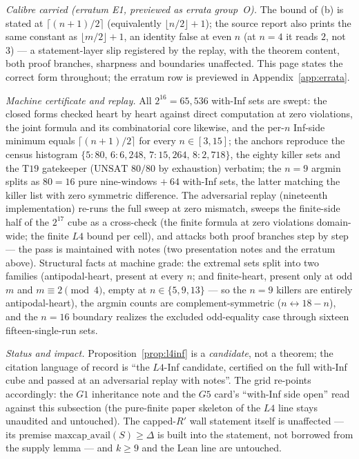 \emph{Calibre carried (erratum E1, previewed as errata group~O).} The bound of (b)
is stated at $\lceil(n+1)/2\rceil$ (equivalently $\lfloor n/2\rfloor+1$); the
source report also prints the same constant as $\lfloor m/2\rfloor+1$, an identity
false at even $n$ (at $n=4$ it reads $2$, not $3$) --- a statement-layer slip
registered by the replay, with the theorem content, both proof branches, sharpness
and boundaries unaffected. This page states the correct form throughout; the
erratum row is previewed in Appendix~\ref{app:errata}.

\emph{Machine certificate and replay.} All $2^{16}=65{,}536$ with-Inf sets are
swept: the closed forms checked heart by heart against direct computation at zero
violations, the joint formula and its combinatorial core likewise, and the per-$n$
Inf-side minimum equals $\lceil(n+1)/2\rceil$ for every $n\in[3,15]$; the anchors
reproduce the census histogram
$\{5{:}80,\,6{:}6{,}248,\,7{:}15{,}264,\,8{:}2{,}718\}$, the eighty killer sets and
the $\mathrm{T19}$ gatekeeper ($\mathrm{UNSAT}$ $80/80$ by exhaustion) verbatim; the
$n=9$ argmin splits as $80=16$ pure nine-windows $+\ 64$ with-Inf sets, the latter
matching the killer list with zero symmetric difference. The adversarial replay
(nineteenth implementation) re-runs the full sweep at zero mismatch, sweeps the
finite-side half of the $2^{17}$ cube as a cross-check (the finite formula at zero
violations domain-wide; the finite $L4$ bound per cell), and attacks both proof
branches step by step --- the pass is maintained with notes (two presentation notes
and the erratum above). Structural facts at machine grade: the extremal sets split
into two families (antipodal-heart, present at every $n$; and finite-heart, present
only at odd $m$ and $m\equiv2\pmod4$, empty at $n\in\{5,9,13\}$ --- so the $n=9$
killers are entirely antipodal-heart), the argmin counts are complement-symmetric
($n\leftrightarrow18-n$), and the $n=16$ boundary realizes the excluded
odd-equality case through sixteen fifteen-single-run sets.

\emph{Status and impact.} Proposition~\ref{prop:l4inf} is a \emph{candidate}, not a
theorem; the citation language of record is ``the $L4$-Inf candidate, certified on
the full with-Inf cube and passed at an adversarial replay with notes''. The grid
re-points accordingly: the $G1$ inheritance note and the $G5$ card's ``with-Inf
side open'' read against this subsection (the pure-finite paper skeleton of the
$L4$ line stays unaudited and untouched). The capped-$R'$ wall statement itself is
unaffected --- its premise $\mathrm{maxcap\_avail}(S)\ge\Delta$ is built into the
statement, not borrowed from the supply lemma --- and $k\ge9$ and the Lean line are
untouched.


